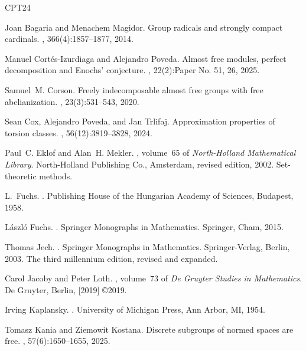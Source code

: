 \documentclass[a4paper]{amsart}
\theoremstyle{definition}
\theoremstyle{remark}
\numberwithin{equation}{section}
\begin{document}
\begin{thebibliography}{CPT24}

Joan Bagaria and Menachem Magidor.
\newblock Group radicals and strongly compact cardinals.
, 366(4):1857--1877, 2014.

Manuel Cort\'es-Izurdiaga and Alejandro Poveda.
\newblock Almost free modules, perfect decomposition and {E}nochs' conjecture.
, 22(2):Paper No. 51, 26, 2025.

Samuel~M. Corson.
\newblock Freely indecomposable almost free groups with free abelianization.
, 23(3):531--543, 2020.

Sean Cox, Alejandro Poveda, and Jan Trlifaj.
\newblock Approximation properties of torsion classes.
, 56(12):3819--3828, 2024.

Paul~C. Eklof and Alan~H. Mekler.
, volume~65 of {\em North-Holland Mathematical Library}.
\newblock North-Holland Publishing Co., Amsterdam, revised edition, 2002.
\newblock Set-theoretic methods.

L.~Fuchs.
.
\newblock Publishing House of the Hungarian Academy of Sciences, Budapest, 1958.

L\'aszl\'o Fuchs.
.
\newblock Springer Monographs in Mathematics. Springer, Cham, 2015.

Thomas Jech.
.
\newblock Springer Monographs in Mathematics. Springer-Verlag, Berlin, 2003.
\newblock The third millennium edition, revised and expanded.

Carol Jacoby and Peter Loth.
, volume~73 of {\em De Gruyter Studies in Mathematics}.
\newblock De Gruyter, Berlin, [2019] \copyright 2019.

Irving Kaplansky.
.
\newblock University of Michigan Press, Ann Arbor, MI, 1954.

Tomasz Kania and Ziemowit Kostana.
\newblock Discrete subgroups of normed spaces are free.
, 57(6):1650--1655, 2025.


\end{thebibliography}
\end{document}
